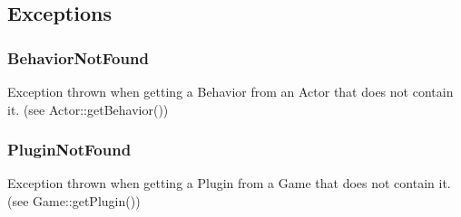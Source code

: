\subsection{Exceptions}
\subsubsection{BehaviorNotFound}
Exception thrown when getting a Behavior from an Actor that
does not contain it. (see Actor::getBehavior())
\subsubsection{PluginNotFound}
Exception thrown when getting a Plugin from a Game that
does not contain it. (see Game::getPlugin())
